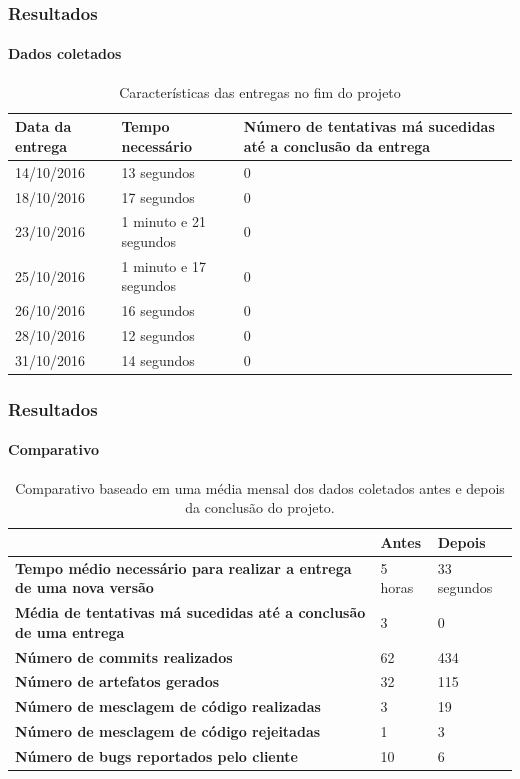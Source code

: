 \documentclass[aspectratio=169]{beamer}
\begin{document}
\begin{frame}
	\frametitle{Resultados}
	\framesubtitle{Dados coletados}
	
	\begin{table}[htb]
		\caption{Características das entregas no fim do projeto}
		
		\label{tab-deploys-new}	
		\begin{tabular}{p{3.0cm}|p{5.0cm}|p{5.20cm}}
			\textbf{Data da entrega} & \textbf{Tempo necessário} & \textbf{Número de tentativas má sucedidas até a conclusão da entrega}  \\
			\hline
			14/10/2016 & 13 segundos & 0 \\
			\hline
			18/10/2016 & 17 segundos & 0 \\
			\hline
			23/10/2016 & 1 minuto e 21 segundos & 0 \\
			\hline
			25/10/2016 & 1 minuto e 17 segundos & 0 \\
			\hline
			26/10/2016 & 16 segundos & 0 \\
			\hline
			28/10/2016 & 12 segundos & 0 \\
			\hline
			31/10/2016 & 14 segundos & 0 \\
		\end{tabular}
	\end{table}
	
\end{frame}

\begin{frame}
	\frametitle{Resultados}
	\framesubtitle{Comparativo}
	
	\begin{table}[htb]
		\caption{Comparativo baseado em uma média mensal dos dados coletados antes e depois da conclusão do projeto.}
		
		\label{tab-comparativo}	
		\begin{tabular}{p{7.85cm}|p{2.5cm}|p{2.5cm}}
			& \textbf{Antes} & \textbf{Depois}  \\
			\hline
			\textbf{Tempo médio necessário para realizar a entrega de uma nova versão} & 5 horas & 33 segundos \\
			\hline
			\textbf{Média de tentativas má sucedidas até a conclusão de uma entrega} & 3 & 0 \\
			\hline
			\textbf{Número de commits realizados} & 62 & 434 \\
			\hline
			\textbf{Número de artefatos gerados} & 32 & 115 \\
			\hline
			\textbf{Número de mesclagem de código realizadas} & 3 & 19 \\
			\hline
			\textbf{Número de mesclagem de código rejeitadas} & 1 & 3 \\
			\hline
			\textbf{Número de bugs reportados pelo cliente} & 10 & 6 \\
		\end{tabular}
	\end{table}
	
\end{frame}
\end{document}

